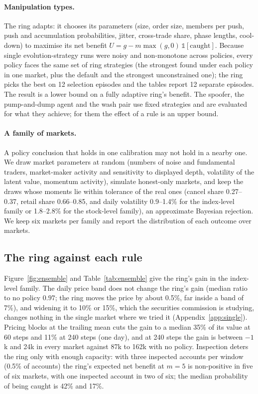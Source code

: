 \documentclass[11pt,a4paper]{article}
\begin{document}
\paragraph{Manipulation types.} The ring adapts: it chooses its parameters (size, order size, members per push, push and accumulation probabilities, jitter, cross-trade share, phase lengths, cool-down) to maximise its net benefit $U=g-m\max(g,0)\,\mathbb 1[\text{caught}]$. Because single evolution-strategy runs were noisy and non-monotone across policies, every policy faces the same set of ring strategies (the strongest found under each policy in one market, plus the default and the strongest unconstrained one); the ring picks the best on 12 selection episodes and the tables report 12 separate episodes. The result is a lower bound on a fully adaptive ring's benefit. The spoofer, the pump-and-dump agent and the wash pair use fixed strategies and are evaluated for what they achieve; for them the effect of a rule is an upper bound.

\paragraph{A family of markets.} A policy conclusion that holds in one calibration may not hold in a nearby one. We draw market parameters at random (numbers of noise and fundamental traders, market-maker activity and sensitivity to displayed depth, volatility of the latent value, momentum activity), simulate honest-only markets, and keep the draws whose moments lie within tolerance of the real ones (cancel share 0.27--0.37, retail share 0.66--0.85, and daily volatility 0.9--1.4\% for the index-level family or 1.8--2.8\% for the stock-level family), an approximate Bayesian rejection. We keep six markets per family and report the distribution of each outcome over markets.

\subsection{The ring against each rule}

Figure~\ref{fig:ensemble} and Table~\ref{tab:ensemble} give the ring's gain in the index-level family. The daily price band does not change the ring's gain (median ratio to no policy $0.97$; the ring moves the price by about 0.5\%, far inside a band of 7\%), and widening it to 10\% or 15\%, which the securities commission is studying, changes nothing in the single market where we tried it (Appendix~\ref{app:single}). Pricing blocks at the trailing mean cuts the gain to a median 35\% of its value at 60 steps and 11\% at 240 steps (one day), and at 240 steps the gain is between $-1$k and 24k in every market against 87k to 162k with no policy. Inspection deters the ring only with enough capacity: with three inspected accounts per window (0.5\% of accounts) the ring's expected net benefit at $m=5$ is non-positive in five of six markets, with one inspected account in two of six; the median probability of being caught is 42\% and 17\%.
\end{document}
